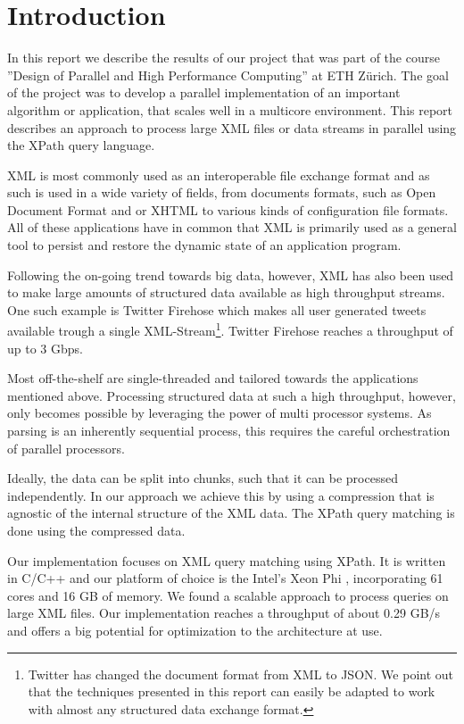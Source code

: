 \section{Introduction}\label{sec:intro}

In this report we describe the results of our project that was part of the
course ''Design of Parallel and High Performance Computing'' at ETH Z\"urich.
The goal of the project was to develop a parallel implementation of an important
algorithm or application, that scales well in a multicore environment. This
report describes an approach to process large XML files or data streams in
parallel using the XPath query language.

XML is most commonly used as an interoperable file exchange format and as such
is used in a wide variety of fields, from documents formats, such as Open
Document Format  and or XHTML  to various kinds of
configuration file formats. All of these applications have in common that XML is
primarily used as a general tool to persist and restore the dynamic state of an
application program.

Following the on-going trend towards big data, however, XML has also been used
to make large amounts of structured data available as high throughput streams.
One such example is Twitter Firehose which makes all user generated tweets
available trough a single XML-Stream\footnote{Twitter has changed the document
format from XML to JSON. We point out that the techniques presented in this
report can easily be adapted to work with almost any structured data exchange
format.}. Twitter Firehose reaches a throughput of up to 3 Gbps.

Most off-the-shelf are single-threaded and tailored towards the applications
mentioned above. Processing structured data at such a high throughput, however,
only becomes possible by leveraging the power of multi processor systems. As
parsing is an inherently sequential process, this requires the careful
orchestration of parallel processors.

Ideally, the data can be split into chunks, such that it can be processed independently.
In our approach we achieve this by using a compression that is agnostic of the
internal structure of the XML data. The XPath query matching is done using the
compressed data.

Our implementation focuses on XML query matching using XPath. It is written in
C/C++ and our platform of choice is the Intel's Xeon Phi \cite{IntelXeon}, incorporating 61 cores
and 16 GB of memory. We found a scalable approach to process queries on large
XML files. Our implementation reaches a throughput of about 0.29 GB/s and offers
a big potential for optimization to the architecture at use. 

